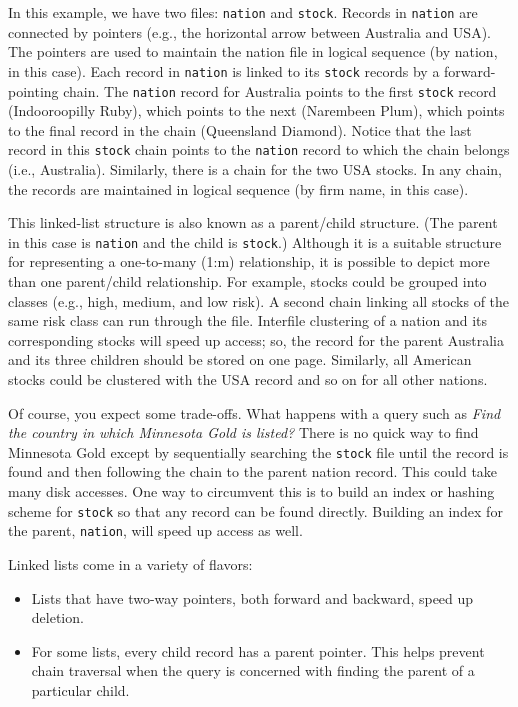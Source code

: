 \documentclass[
]{article}
\begin{document}
In this example, we have two files: \texttt{nation} and \texttt{stock}. Records in
\texttt{nation} are connected by pointers (e.g., the horizontal arrow between
Australia and USA). The pointers are used to maintain the nation file in
logical sequence (by nation, in this case). Each record in \texttt{nation} is
linked to its \texttt{stock} records by a forward-pointing chain. The \texttt{nation}
record for Australia points to the first \texttt{stock} record (Indooroopilly
Ruby), which points to the next (Narembeen Plum), which points to the
final record in the chain (Queensland Diamond). Notice that the last
record in this \texttt{stock} chain points to the \texttt{nation} record to which the
chain belongs (i.e., Australia). Similarly, there is a chain for the two
USA stocks. In any chain, the records are maintained in logical sequence
(by firm name, in this case).

This linked-list structure is also known as a parent/child structure.
(The parent in this case is \texttt{nation} and the child is \texttt{stock}.) Although
it is a suitable structure for representing a one-to-many (1:m)
relationship, it is possible to depict more than one parent/child
relationship. For example, stocks could be grouped into classes (e.g.,
high, medium, and low risk). A second chain linking all stocks of the
same risk class can run through the file. Interfile clustering of a
nation and its corresponding stocks will speed up access; so, the record
for the parent Australia and its three children should be stored on one
page. Similarly, all American stocks could be clustered with the USA
record and so on for all other nations.

Of course, you expect some trade-offs. What happens with a query such as
\emph{Find the country in which Minnesota Gold is listed?} There is no quick
way to find Minnesota Gold except by sequentially searching the \texttt{stock}
file until the record is found and then following the chain to the
parent nation record. This could take many disk accesses. One way to
circumvent this is to build an index or hashing scheme for \texttt{stock} so
that any record can be found directly. Building an index for the parent,
\texttt{nation}, will speed up access as well.

Linked lists come in a variety of flavors:

\begin{itemize}
\item
  Lists that have two-way pointers, both forward and backward, speed
  up deletion.
\item
  For some lists, every child record has a parent pointer. This helps
  prevent chain traversal when the query is concerned with finding the
  parent of a particular child.
\end{itemize}
\end{document}
